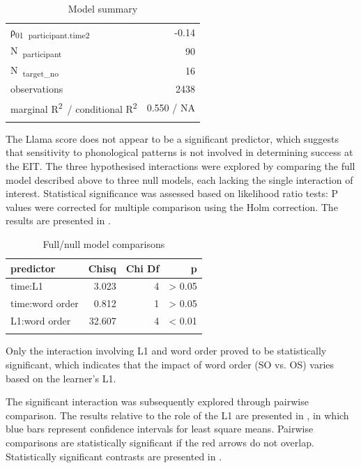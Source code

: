 \begin{table}
\begin{tabularx}{\textwidth}{Xrrr}
    ρ\textsubscript{01}~\textsubscript{participant.time2} & \multicolumn{3}{r}{{}-0.14}\\
    N~\textsubscript{participant} & \multicolumn{3}{r}{90}\\
    N~\textsubscript{target\_no} & \multicolumn{3}{r}{16}\\
    \midrule
    observations & \multicolumn{3}{r}{2438}\\
    marginal R\textsuperscript{2}~/ conditional R\textsuperscript{2} & \multicolumn{3}{r}{0.550 / NA}\\
    \lspbottomrule
    \end{tabularx}
    \caption{Model summary}
    \label{tab:04:3}
\end{table}

The Llama score does not appear to be a significant predictor, which suggests that sensitivity to phonological patterns is not involved in determining success at the EIT. The three hypothesised interactions were explored by comparing the full model described above to three null models, each lacking the single interaction of interest. Statistical significance was assessed based on likelihood ratio tests: P values were corrected for multiple comparison using the Holm correction. The results are presented in .

\begin{table}
    \begin{tabularx}{.8\textwidth}{Xrrr}
    \lsptoprule
    predictor & Chisq & Chi Df & p\\
    \midrule
    time:L1 & 3.023 & 4 & > 0.05\\
    time:word order & 0.812 & 1 & > 0.05\\
    L1:word order & 32.607 & 4 & < 0.01\\
    \lspbottomrule
    \end{tabularx}
    \caption{Full/null model comparisons}
    \label{tab:04:4}
\end{table}

Only the interaction involving L1 and word order proved to be statistically significant, which indicates that the impact of word order (SO vs. OS) varies based on the learner’s L1. 

The significant interaction was subsequently explored through pairwise comparison. The results relative to the role of the L1 are presented in , in which blue bars represent confidence intervals for least square means. Pairwise comparisons are statistically significant if the red arrows do not overlap. Statistically significant contrasts are presented in .

